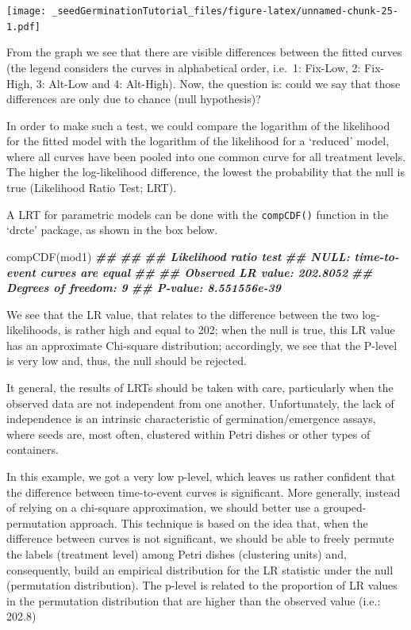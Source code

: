\documentclass[
]{book}
\newenvironment{Shaded}{\begin{snugshade}}{\end{snugshade}}
\newcommand{\DocumentationTok}[1]{\textcolor[rgb]{0.56,0.35,0.01}{\textbf{\textit{#1}}}}
\newcommand{\FunctionTok}[1]{\textcolor[rgb]{0.00,0.00,0.00}{#1}}
\newcommand{\NormalTok}[1]{#1}
\begin{document}
\texttt{[image: \_seedGerminationTutorial\_files/figure-latex/unnamed-chunk-25-1.pdf]}

From the graph we see that there are visible differences between the fitted curves (the legend considers the curves in alphabetical order, i.e.~1: Fix-Low, 2: Fix-High, 3: Alt-Low and 4: Alt-High). Now, the question is: could we say that those differences are only due to chance (null hypothesis)?

In order to make such a test, we could compare the logarithm of the likelihood for the fitted model with the logarithm of the likelihood for a `reduced' model, where all curves have been pooled into one common curve for all treatment levels. The higher the log-likelihood difference, the lowest the probability that the null is true (Likelihood Ratio Test; LRT).

A LRT for parametric models can be done with the \texttt{compCDF()} function in the `drcte' package, as shown in the box below.

\begin{Shaded}
\begin{Highlighting}[]
\FunctionTok{compCDF}\NormalTok{(mod1)}
\DocumentationTok{\#\# }
\DocumentationTok{\#\# }
\DocumentationTok{\#\# Likelihood ratio test}
\DocumentationTok{\#\# NULL: time{-}to{-}event curves are equal}
\DocumentationTok{\#\# }
\DocumentationTok{\#\# Observed LR value:  202.8052}
\DocumentationTok{\#\# Degrees of freedom:  9}
\DocumentationTok{\#\# P{-}value:  8.551556e{-}39}
\end{Highlighting}
\end{Shaded}

We see that the LR value, that relates to the difference between the two log-likelihoods, is rather high and equal to 202; when the null is true, this LR value has an approximate Chi-square distribution; accordingly, we see that the P-level is very low and, thus, the null should be rejected.

It general, the results of LRTs should be taken with care, particularly when the observed data are not independent from one another. Unfortunately, the lack of independence is an intrinsic characteristic of germination/emergence assays, where seeds are, most often, clustered within Petri dishes or other types of containers.

In this example, we got a very low p-level, which leaves us rather confident that the difference between time-to-event curves is significant. More generally, instead of relying on a chi-square approximation, we should better use a grouped-permutation approach. This technique is based on the idea that, when the difference between curves is not significant, we should be able to freely permute the labels (treatment level) among Petri dishes (clustering units) and, consequently, build an empirical distribution for the LR statistic under the null (permutation distribution). The p-level is related to the proportion of LR values in the permutation distribution that are higher than the observed value (i.e.: 202.8)
\end{document}
